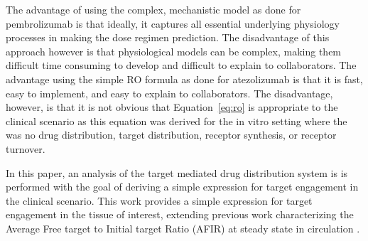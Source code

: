 The advantage of using the complex, mechanistic model as done for pembrolizumab is that ideally, it captures all essential underlying physiology processes in making the dose regimen prediction.  The disadvantage of this approach however is that physiological models can be complex, making them difficult time consuming to develop and difficult to explain to collaborators.  The advantage using the simple RO formula as done for atezolizumab is that it is fast, easy to implement, and easy to explain to collaborators.  The disadvantage, however, is that it is not obvious that Equation~\ref{eq:ro} is appropriate to the clinical scenario as this equation was derived for the in vitro setting \cite{boeynaems80} where the was no drug distribution, target distribution, receptor synthesis, or receptor turnover.

In this paper, an analysis of the target mediated drug distribution system is is performed with the goal of deriving a simple expression for target engagement in the clinical scenario.  This work provides a simple expression for target engagement in the tissue of interest, extending previous work characterizing the Average Free target to Initial target Ratio (AFIR) at steady state in circulation \cite{stein17}.